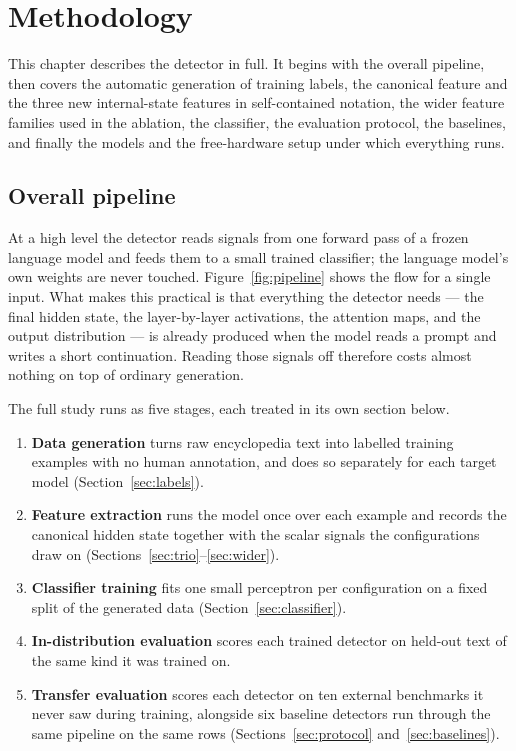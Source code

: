 \chapter{Methodology}
\label{ch:method}

This chapter describes the detector in full. It begins with the overall pipeline, then
covers the automatic generation of training labels, the canonical feature and the three
new internal-state features in self-contained notation, the wider feature families used
in the ablation, the classifier, the evaluation protocol, the baselines, and finally the
models and the free-hardware setup under which everything runs.

\section{Overall pipeline}

At a high level the detector reads signals from one forward pass of a frozen language model
and feeds them to a small trained classifier; the language model's own weights are never
touched. Figure~\ref{fig:pipeline} shows the flow for a single input. What makes this
practical is that everything the detector needs --- the final hidden state, the
layer-by-layer activations, the attention maps, and the output distribution --- is already
produced when the model reads a prompt and writes a short continuation. Reading those signals
off therefore costs almost nothing on top of ordinary generation.

The full study runs as five stages, each treated in its own section below.

\begin{enumerate}[leftmargin=2.2em,itemsep=0.3em,label=\textbf{Stage \arabic*.}]
\item \textbf{Data generation} turns raw encyclopedia text into labelled training examples
with no human annotation, and does so separately for each target model
(Section~\ref{sec:labels}).
\item \textbf{Feature extraction} runs the model once over each example and records the
canonical hidden state together with the scalar signals the configurations draw on
(Sections~\ref{sec:trio}--\ref{sec:wider}).
\item \textbf{Classifier training} fits one small perceptron per configuration on a fixed
split of the generated data (Section~\ref{sec:classifier}).
\item \textbf{In-distribution evaluation} scores each trained detector on held-out text of
the same kind it was trained on.
\item \textbf{Transfer evaluation} scores each detector on ten external benchmarks it never
saw during training, alongside six baseline detectors run through the same pipeline on the
same rows (Sections~\ref{sec:protocol} and~\ref{sec:baselines}).
\end{enumerate}


